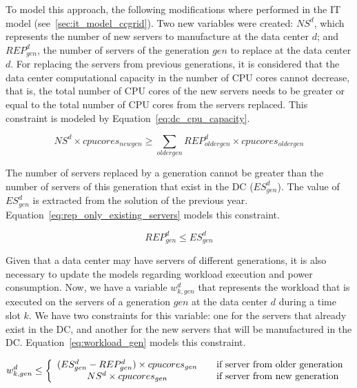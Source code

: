 To model this approach, the following modifications where performed in the IT model (see~\ref{sec:it_model_ccgrid}). Two new variables were created: $NS^d$, which represents the number of new servers to manufacture at the data center $d$; and $REP_{gen}^d$, the number of servers of the generation $gen$ to replace at the data center $d$. For replacing the servers from previous generations, it is considered that the data center computational capacity in the number of CPU cores cannot decrease, that is, the total number of CPU cores of the new servers needs to be greater or equal to the total number of CPU cores from the servers replaced. This constraint is modeled by Equation~\eqref{eq:dc_cpu_capacity}.

\begin{equation} \label{eq:dc_cpu_capacity}
 NS^d \times cpucores_{newgen} \geq \sum_{oldergen}  REP_{oldergen}^d \times cpucores_{oldergen}
\end{equation}

The number of servers replaced by a generation cannot be greater than the number of servers of this generation that exist in the DC ($ES_{gen}^d $). The value of  $ES_{gen}^d $ is extracted from the solution of the previous year. Equation~\eqref{eq:rep_only_existing_servers} models this constraint.

\begin{equation} \label{eq:rep_only_existing_servers}
 REP_{gen}^d \leq ES_{gen}^d 
\end{equation}


Given that a data center may have servers of different generations, it is also necessary to update the models regarding workload execution and power consumption. Now, we have a variable $w_{k,gen}^d$ that represents the workload that is executed on the servers of a generation $gen$ at the data center $d$ during a time slot $k$. We have two constraints for this variable: one for the servers that already exist in the DC, and another for the new servers that will be manufactured in the DC. Equation~\eqref{eq:workload_gen} models this constraint.


\begin{equation} \label{eq:workload_gen}
w_{k,gen}^d \leq   \left\{ 
  \begin{array}{ c l }
    (ES_{gen}^d - REP_{gen}^d) \times cpucores_{gen}  & \quad \textrm{if server from older generation  }     \\
     NS^d \times cpucores_{gen}   & \quad \textrm{if server from new generation  }      \\
    
  \end{array}
\right.
\end{equation}


